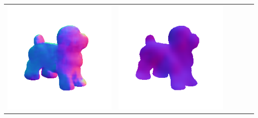 \begin{tabularx}{\linewidth}{@{}Y@{}Y@{}Y@{}Y@{}Y@{}Y@{}}
\includegraphics[width=\linewidth]{semisynthetic/20160617_17_marrnet_out.png} &
\includegraphics[width=\linewidth]{semisynthetic/20160617_17_ef_out.png} \\

\end{tabularx}
